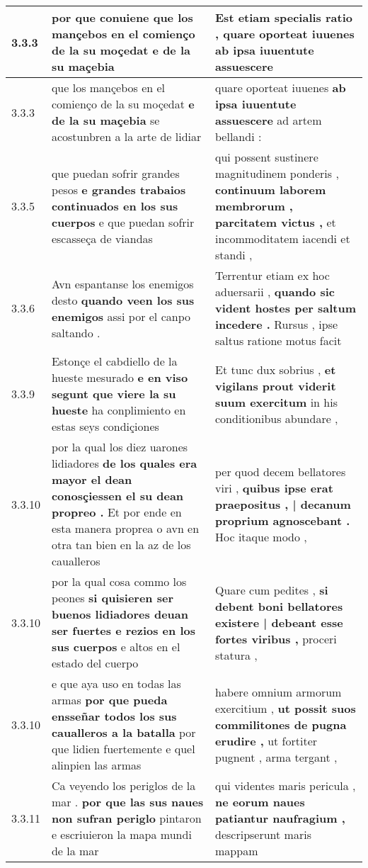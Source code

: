 \begin{tabular}{|p{1cm}|p{6.5cm}|p{6.5cm}|}
3.3.3 & por que conuiene \textbf{ que los mançebos en el comienço de la su moçedat } e de la su maçebia & Est etiam specialis ratio , \textbf{ quare oporteat iuuenes } ab ipsa iuuentute assuescere \\\hline
3.3.3 & que los mançebos en el comienço de la su moçedat \textbf{ e de la su maçebia } se acostunbren a la arte de lidiar & quare oporteat iuuenes \textbf{ ab ipsa iuuentute assuescere } ad artem bellandi : \\\hline
3.3.5 & que puedan sofrir grandes pesos \textbf{ e grandes trabaios continuados en los sus cuerpos } e que puedan sofrir escasseça de viandas & qui possent sustinere magnitudinem ponderis , \textbf{ continuum laborem membrorum , parcitatem victus , } et incommoditatem iacendi et standi , \\\hline
3.3.6 & Avn espantanse los enemigos desto \textbf{ quando veen los sus enemigos } assi por el canpo saltando . & Terrentur etiam ex hoc aduersarii , \textbf{ quando sic vident hostes per saltum incedere . } Rursus , ipse saltus ratione motus facit \\\hline
3.3.9 & Estonçe el cabdiello de la hueste mesurado \textbf{ e en viso segunt que viere la su hueste } ha conplimiento en estas seys condiçiones & Et tunc dux sobrius , \textbf{ et vigilans prout viderit suum exercitum } in his conditionibus abundare , \\\hline
3.3.10 & por la qual los diez uarones lidiadores \textbf{ de los quales era mayor el dean conosçiessen el su dean propreo . } Et por ende en esta manera proprea o avn en otra tan bien en la az de los caualleros & per quod decem bellatores viri , \textbf{ quibus ipse erat praepositus , | decanum proprium agnoscebant . } Hoc itaque modo , \\\hline
3.3.10 & por la qual cosa commo los peones \textbf{ si quisieren ser buenos lidiadores deuan ser fuertes e rezios en los sus cuerpos } e altos en el estado del cuerpo & Quare cum pedites , \textbf{ si debent boni bellatores existere | debeant esse fortes viribus , } proceri statura , \\\hline
3.3.10 & e que aya uso en todas las armas \textbf{ por que pueda ensseñar todos los sus caualleros a la batalla } por que lidien fuertemente e quel alinpien las armas & habere omnium armorum exercitium , \textbf{ ut possit suos commilitones de pugna erudire , } ut fortiter pugnent , arma tergant , \\\hline
3.3.11 & Ca veyendo los periglos de la mar . \textbf{ por que las sus naues non sufran periglo } pintaron e escriuieron la mapa mundi de la mar & qui videntes maris pericula , \textbf{ ne eorum naues patiantur naufragium , } descripserunt maris mappam \\\hline

\end{tabular}
